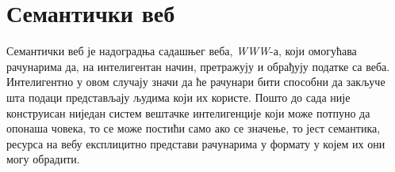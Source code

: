 \documentclass[12pt,oneside]{memoir}
\begin{document}







\section{Семантички веб}
\label{sec:semantic_veb_main}

Семантички веб је надоградња садашњег веба, \textit{WWW}-а, који омогућава рачунарима да, на интелигентан начин, претражују и обрађују податке са веба. Интелигентно у овом случају значи да ће рачунари бити способни да закључе шта подаци представљају људима који их користе. Пошто до сада није конструисан ниједан систем вештачке интелигенције који може потпуно да опонаша човека, то се може постићи само ако се значење, то јест семантика, ресурса на вебу експлицитно представи рачунарима у формату у којем их они могу обрадити. \cite{semantic}
\end{document}

